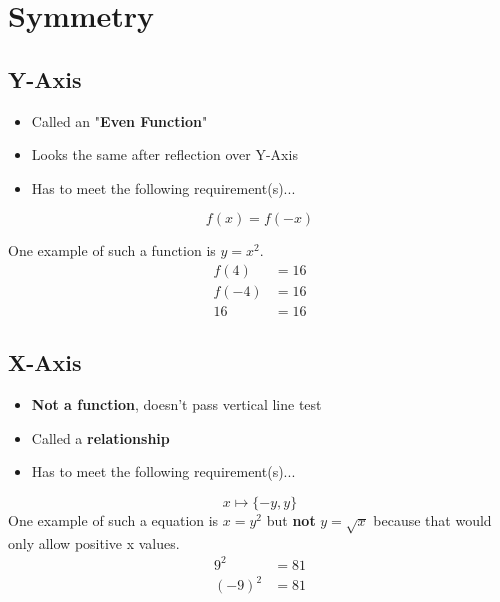\documentclass[twocolumn]{article}
\newcommand{\bd}{\textbf}
\newcommand{\dquad}{\quad{}\quad{}}
\begin{document}
	\section{Symmetry}
		\subsection{Y-Axis}
			\begin{itemize}[label=\dquad{}--]
				\item Called an "\bd{Even Function}"
				\item Looks the same after reflection over Y-Axis
				\item Has to meet the following requirement(s)...
			\end{itemize}
			\begin{equation*}
				f(x) = f(-x)
			\end{equation*}
			\par One example of such a function is $y = x^2$.
			\begin{align*}
				f(4) &= 16 \\
				f(-4) &= 16 \\
				16 &= 16
			\end{align*}
		
		\subsection{X-Axis}
			\begin{itemize}[label=\dquad{}--]
				\item \bd{Not a function}, doesn't pass vertical line test
				\item Called a \bd{relationship}
				\item Has to meet the following requirement(s)...
			\end{itemize}
			\begin{equation*}
				x \mapsto \{-y,  y\}
			\end{equation*}
			One example of such a equation is $x = y^2$ but \bd{not} $y = \sqrt{x}$ because that would only allow positive x values.
			\begin{align*}
				9^2 &= 81 \\
				(-9)^2 &= 81
			\end{align*}
		
\end{document}
